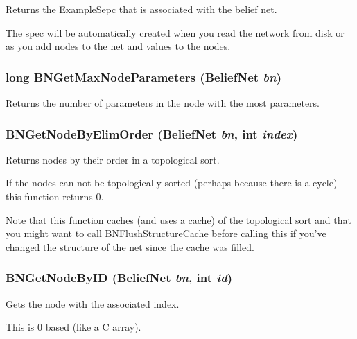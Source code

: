 Returns the Example\-Sepc that is associated with the belief net. 

The spec will be automatically created when you read the network from disk or as you add nodes to the net and values to the nodes. 
\subsubsection{\setlength{\rightskip}{0pt plus 5cm}long BNGet\-Max\-Node\-Parameters ({\bf Belief\-Net} {\em bn})}\label{BeliefNet_8h_a69}


Returns the number of parameters in the node with the most parameters. 

\subsubsection{ BNGet\-Node\-By\-Elim\-Order ({\bf Belief\-Net} {\em bn}, int {\em index})}\label{BeliefNet_8h_a58}


Returns nodes by their order in a topological sort. 

If the nodes can not be topologically sorted (perhaps because there is a cycle) this function returns 0.

Note that this function caches (and uses a cache) of the topological sort and that you might want to call BNFlush\-Structure\-Cache before calling this if you've changed the structure of the net since the cache was filled. 
\subsubsection{ BNGet\-Node\-By\-ID ({\bf Belief\-Net} {\em bn}, int {\em id})}\label{BeliefNet_8h_a56}


Gets the node with the associated index. 

This is 0 based (like a C array). 
